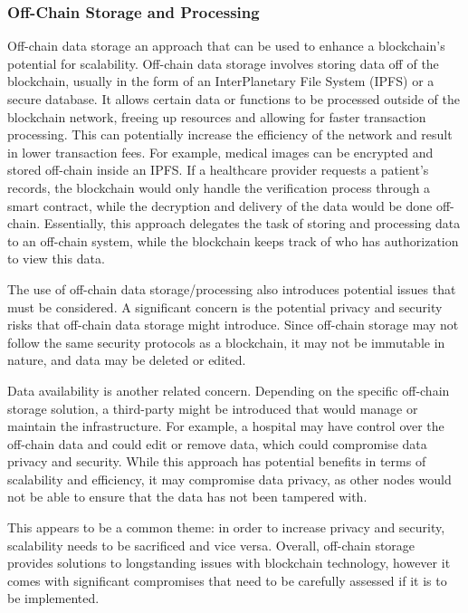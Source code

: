 \documentclass{article}
\begin{document}
\subsubsection{Off-Chain Storage and Processing}
Off-chain data storage an approach that can be used to enhance a blockchain's potential for scalability. Off-chain data storage involves storing data off of the blockchain, usually in the form of an InterPlanetary File System (IPFS) or a secure database. It allows certain data or functions to be processed outside of the blockchain network, freeing up resources and allowing for faster transaction processing. This can potentially increase the efficiency of the network and result in lower transaction fees. For example, medical images can be encrypted and stored off-chain inside an IPFS. If a healthcare provider requests a patient's records, the blockchain would only handle the verification process through a smart contract, while the decryption and delivery of the data would be done off-chain. Essentially, this approach delegates the task of storing and processing data to an off-chain system, while the blockchain keeps track of who has authorization to view this data.

The use of off-chain data storage/processing also introduces potential issues that must be considered. A significant concern is the potential privacy and security risks that off-chain data storage might introduce. Since off-chain storage may not follow the same security protocols as a blockchain, it may not be immutable in nature, and data may be deleted or edited.

Data availability is another related concern. Depending on the specific off-chain storage solution, a third-party might be introduced that would manage or maintain the infrastructure. For example, a hospital may have control over the off-chain data and could edit or remove data, which could compromise data privacy and security. While this approach has potential benefits in terms of scalability and efficiency, it may compromise data privacy, as other nodes would not be able to ensure that the data has not been tampered with. 

This appears to be a common theme: in order to increase privacy and security, scalability needs to be sacrificed and vice versa. Overall, off-chain storage provides solutions to longstanding issues with blockchain technology, however it comes with significant compromises that need to be carefully assessed if it is to be implemented.
\end{document}
